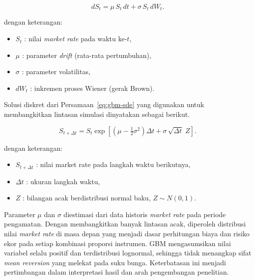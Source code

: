\begin{equation}
    \label{eq:gbm-sde}
    dS_t = \mu\,S_t\,dt + \sigma\,S_t\,dW_t.
\end{equation}

dengan keterangan:
\begin{itemize}
    \item $S_t$ : nilai \textit{market rate} pada waktu ke-$t$,
    \item $\mu$ : parameter \textit{drift} (rata-rata pertumbuhan),
    \item $\sigma$ : parameter volatilitas,
    \item $dW_t$ : inkremen proses Wiener (gerak Brown).
\end{itemize}

Solusi diskret dari Persamaan~\ref{eq:gbm-sde} yang digunakan untuk membangkitkan lintasan simulasi dinyatakan sebagai berikut.

\begin{equation}
    \label{eq:gbm-discrete}
    S_{t+\Delta t} = S_t \exp\!\left[\left(\mu - \tfrac{1}{2}\sigma^2\right)\Delta t + \sigma\,\sqrt{\Delta t}\;Z\right].
    \end{equation}

dengan keterangan:
\begin{itemize} 
    \item $S_{t+\Delta t}$ : nilai market rate pada langkah waktu berikutnya,
    \item $\Delta t$ : ukuran langkah waktu,
    \item $Z$ : bilangan acak berdistribusi normal baku, $Z \sim N(0,1)$.
\end{itemize}

Parameter $\mu$ dan $\sigma$ diestimasi dari data historis \textit{market rate} pada periode pengamatan. Dengan membangkitkan banyak lintasan acak, diperoleh distribusi nilai \textit{market rate} di masa depan yang menjadi dasar perhitungan biaya dan risiko ekor pada setiap kombinasi proporsi instrumen. GBM mengasumsikan nilai variabel selalu positif dan terdistribusi lognormal, sehingga tidak menangkap sifat \textit{mean reversion} yang melekat pada suku bunga. Keterbatasan ini menjadi pertimbangan dalam interpretasi hasil dan arah pengembangan penelitian.


